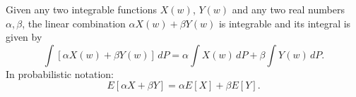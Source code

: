 Given any two integrable functions $X(w)$, $Y(w)$ and any two real numbers $\alpha, \beta$, the linear combination $\alpha X(w) + \beta Y(w)$ is integrable and its integral is given by
$$\int [\alpha X(w) + \beta Y(w)] \, dP = \alpha \int X(w) \, dP + \beta \int Y(w) \, dP.$$
In probabilistic notation:
$$E[\alpha X + \beta Y] = \alpha E[X] + \beta E[Y].$$
